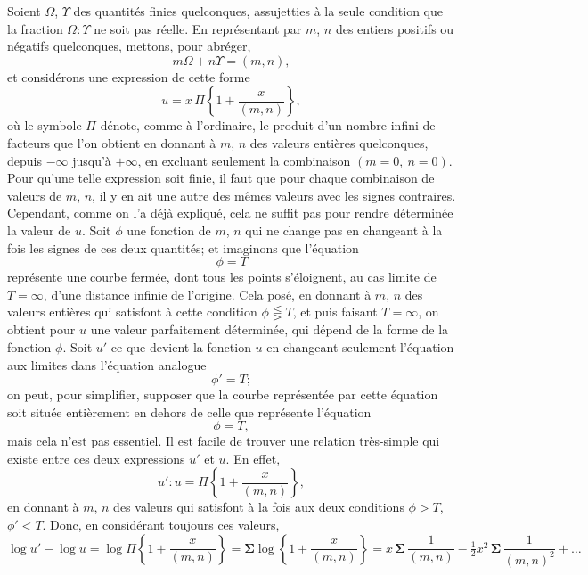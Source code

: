 \documentclass[11pt,a4paper]{article}
\begin{document}
Soient $\Omega$, $\Upsilon$ des quantit\'es finies quelconques, assujetties \`a la seule condition que
la fraction $\Omega : \Upsilon$ ne soit pas r\'eelle. En repr\'esentant par $m$, $n$ des entiers positifs
ou n\'egatifs quelconques, mettons, pour abr\'eger,
\begin{equation}
m\Omega + n\Upsilon = (m, n), \tag{1}
\end{equation}
et consid\'erons une expression de cette forme
\begin{equation}
u = x\, \Pi \left\{1 + \frac{x}{(m, n)}\right\}, \tag{2}
\end{equation}
o\`u le symbole $\Pi$ d\'enote, comme \`a l'ordinaire, le produit d'un nombre infini de facteurs
que l'on obtient en donnant \`a $m$, $n$ des valeurs enti\`eres quelconques, depuis $-\infty$ jusqu'\`a
$+\infty$, en excluant seulement la combinaison $(m = 0,\ n = 0)$. Pour qu'une telle expression
soit finie, il faut que pour chaque combinaison de valeurs de $m$, $n$, il y en ait une
autre des m\^emes valeurs avec les signes contraires. Cependant, comme on l'a d\'ej\`a
expliqu\'e, cela ne suffit pas pour rendre d\'etermin\'ee la valeur de $u$. Soit $\phi$ une
fonction de $m$, $n$ qui ne change pas en changeant \`a la fois les signes de ces deux
quantit\'es; et imaginons que l'\'equation
\[\phi = T\]
repr\'esente une courbe ferm\'ee, dont tous les points s'\'eloignent, au cas limite de
$T = \infty$, d'une distance infinie de l'origine. Cela pos\'e, en donnant \`a $m$, $n$ des valeurs
enti\`eres qui satisfont \`a cette condition $\phi \lesseqgtr T$, et puis faisant $T = \infty$, on obtient
pour $u$ une valeur parfaitement d\'etermin\'ee, qui d\'epend de la forme de la fonction $\phi$.
Soit $u'$ ce que devient la fonction $u$ en changeant seulement l'\'equation aux limites dans
l'\'equation analogue
\[\phi' = T;\]
on peut, pour simplifier, supposer que la courbe repr\'esent\'ee par cette \'equation soit
situ\'ee enti\`erement en dehors de celle que repr\'esente l'\'equation
\[\phi = T,\]
mais cela n'est pas essentiel. Il est facile de trouver une relation tr\`es-simple qui
existe entre ces deux expressions $u'$ et $u$. En effet,
\[u' : u = \Pi \left\{1 + \frac{x}{(m, n)}\right\},\]
en donnant \`a $m$, $n$ des valeurs qui satisfont \`a la fois aux deux conditions $\phi > T$,
$\phi' < T$. Donc, en consid\'erant toujours ces valeurs,
\[\log u' - \log u = \log \Pi \left\{1 + \frac{x}{(m, n)}\right\}
= \boldsymbol{\Sigma} \log \left\{1 + \frac{x}{(m, n)}\right\}
= x\, \boldsymbol{\Sigma}\, \frac{1}{(m, n)} - \tfrac{1}{2}x^2\, \boldsymbol{\Sigma}\, \frac{1}{(m, n)^2} + \ldots\]
\end{document}
